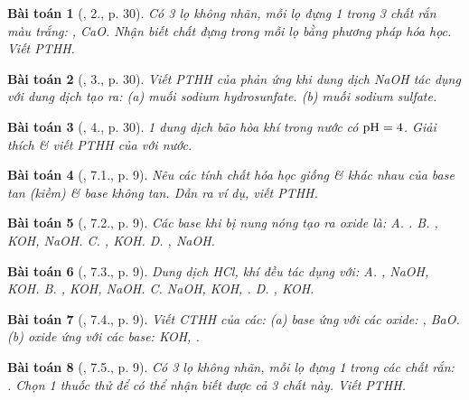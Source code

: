 \documentclass{article}
\newtheorem{baitoan}{Bài toán}
\begin{document}
\begin{baitoan}[\cite{SGK_Hoa_Hoc_9}, 2., p. 30]
	Có 3 lọ không nhãn, mỗi lọ đựng 1 trong 3 chất rắn màu trắng: {\rm{}, CaO}. Nhận biết chất đựng trong mỗi lọ bằng phương pháp hóa học. Viết {\rm PTHH}.
\end{baitoan}

\begin{baitoan}[\cite{SGK_Hoa_Hoc_9}, 3., p. 30]
	Viết {\rm PTHH} của phản ứng khi dung dịch {\rm NaOH} tác dụng với dung dịch {\rm{}} tạo ra: (a) muối sodium hydrosunfate. (b) muối sodium sulfate.
\end{baitoan}

\begin{baitoan}[\cite{SGK_Hoa_Hoc_9}, 4., p. 30]
	1 dung dịch bão hòa khí {\rm{}} trong nước có $\rm pH = 4$. Giải thích \& viết PTHH của {\rm{}} với nước.
\end{baitoan}

\begin{baitoan}[\cite{SGK_Hoa_Hoc_9}, 7.1., p. 9]
	Nêu các tính chất hóa học giống \& khác nhau của base tan (kiềm) \& base không tan. Dẫn ra ví dụ, viết PTHH.
\end{baitoan}

\begin{baitoan}[\cite{SGK_Hoa_Hoc_9}, 7.2., p. 9]
	Các base khi bị nung nóng tạo ra oxide là: {\sf A.} {\rm{}}. {\sf B.} {\rm{}, KOH, NaOH}. {\sf C.} {\rm{}, KOH}. {\sf D.} {\rm{}, NaOH}.
\end{baitoan}

\begin{baitoan}[\cite{SGK_Hoa_Hoc_9}, 7.3., p. 9]
	Dung dịch {\rm HCl}, khí {\rm{}} đều tác dụng với: {\sf A.} {\rm{}, NaOH, KOH}. {\sf B.} {\rm{}, KOH, NaOH}. {\sf C.} {\rm NaOH, KOH, }. {\sf D.} {\rm{}, KOH}.
\end{baitoan}

\begin{baitoan}[\cite{SGK_Hoa_Hoc_9}, 7.4., p. 9]
	Viết CTHH của các: (a) base ứng với các oxide: {\rm{}, BaO}. (b) oxide ứng với các base: {\rm KOH, }.
\end{baitoan}

\begin{baitoan}[\cite{SGK_Hoa_Hoc_9}, 7.5., p. 9]
	Có 3 lọ không nhãn, mỗi lọ đựng 1 trong các chất rắn: {\rm{}}. Chọn 1 thuốc thử để có thể nhận biết được cả 3 chất này. Viết {\rm PTHH}.
\end{baitoan}
\end{document}
